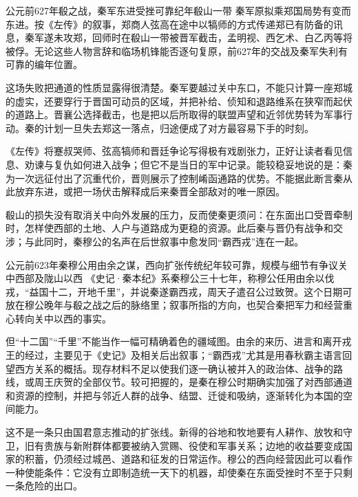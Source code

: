 \begin{event}{公元前627年}{殽之战，秦军东进受挫}{可靠纪年}{殽山一带}
秦军原拟乘郑国局势有变而东进。按《左传》的叙事，郑商人弦高在途中以犒师的方式传递郑已有防备的讯息，秦军遂未攻郑，回师时在殽山一带被晋军截击，孟明视、西乞术、白乙丙等将被俘。无论这些人物言辞和临场机锋能否逐句复原，前627年的交战及秦军失利有可靠的编年位置。

这场失败把通道的性质显露得很清楚。秦军要越过关中东口，不能只计算一座郑城的虚实，还要穿行于晋国可动员的区域，并把补给、侦知和退路维系在狭窄而起伏的道路上。晋襄公选择截击，也是把以后所取得的联盟声望和近邻优势转为军事行动。秦的计划一旦失去郑这一落点，归途便成了对方最容易下手的时刻。

《左传》将蹇叔哭师、弦高犒师和晋廷争论写得极有戏剧张力，正好让读者看见信息、劝谏与复仇如何进入战争；但它不是当日的军中记录。能较稳妥地说的是：秦为一次远征付出了沉重代价，晋则展示了控制崤函通路的优势。不能据此断言秦从此放弃东进，或把一场伏击解释成后来秦晋全部敌对的唯一原因。
\end{event}

殽山的损失没有取消关中向外发展的压力，反而使秦更须问：在东面出口受晋牵制时，怎样使西部的土地、人户与道路成为更稳的资源。此后秦与晋仍有战争和交涉；与此同时，秦穆公的名声在后世叙事中愈发同“霸西戎”连在一起。

\begin{event}{公元前623年}{秦穆公用由余之谋，西向扩张}{传统纪年较可靠，规模与细节有争议}{关中西部及陇山以西}
《史记·秦本纪》系秦穆公三十七年，称穆公任用由余以伐戎，“益国十二，开地千里”，并说秦遂霸西戎，周天子遣召公过致贺。这个日期可放在穆公晚年与殽之战之后的脉络里；叙事所指的方向，也契合秦把军力和经营重心转向关中以西的事实。

但“十二国”“千里”不能当作一幅可精确着色的疆域图。由余的来历、进言和离开戎王的经过，主要见于《史记》及相关后出叙事；“霸西戎”尤其是用春秋霸主语言回望西方关系的概括。现存材料不足以使我们逐一确认被并入的政治体、战争的路线，或周王庆贺的全部仪节。较可把握的，是秦在穆公时期确实加强了对西部通道和资源的控制，并把与邻近人群的战争、结盟、迁徙和吸纳，逐渐转化为本国的空间能力。

这不是一条只由国君意志推动的扩张线。新得的谷地和牧地要有人耕作、放牧和守卫，旧有贵族与新附群体都要被纳入赏赐、役使和军事关系；边地的收益要变成国家的积蓄，仍须经过城邑、道路和征发的日常运作。穆公的西向经营因此可以看作一种使能条件：它没有立即制造统一天下的机器，却使秦在东面受挫时不至于只剩一条危险的出口。
\end{event}

